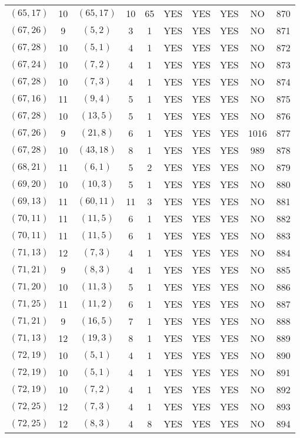\begin{longtable}{|c|c|c|c|c|c|c|c|c|c|}
$(65, 17)$ & 10 & $(65, 17)$ & 10 & 65 & YES & YES & YES & NO & 870\\
$(67, 26)$ & 9 & $(5, 2)$ & 3 & 1 & YES & YES & YES & NO & 871\\
$(67, 28)$ & 10 & $(5, 1)$ & 4 & 1 & YES & YES & YES & NO & 872\\
$(67, 24)$ & 10 & $(7, 2)$ & 4 & 1 & YES & YES & YES & NO & 873\\
$(67, 28)$ & 10 & $(7, 3)$ & 4 & 1 & YES & YES & YES & NO & 874\\
$(67, 16)$ & 11 & $(9, 4)$ & 5 & 1 & YES & YES & YES & NO & 875\\
$(67, 28)$ & 10 & $(13, 5)$ & 5 & 1 & YES & YES & YES & NO & 876\\
$(67, 26)$ & 9 & $(21, 8)$ & 6 & 1 & YES & YES & YES & 1016 & 877\\
$(67, 28)$ & 10 & $(43, 18)$ & 8 & 1 & YES & YES & YES & 989 & 878\\
$(68, 21)$ & 11 & $(6, 1)$ & 5 & 2 & YES & YES & YES & NO & 879\\
$(69, 20)$ & 10 & $(10, 3)$ & 5 & 1 & YES & YES & YES & NO & 880\\
$(69, 13)$ & 11 & $(60, 11)$ & 11 & 3 & YES & YES & YES & NO & 881\\
$(70, 11)$ & 11 & $(11, 5)$ & 6 & 1 & YES & YES & YES & NO & 882\\
$(70, 11)$ & 11 & $(11, 5)$ & 6 & 1 & YES & YES & YES & NO & 883\\
$(71, 13)$ & 12 & $(7, 3)$ & 4 & 1 & YES & YES & YES & NO & 884\\
$(71, 21)$ & 9 & $(8, 3)$ & 4 & 1 & YES & YES & YES & NO & 885\\
$(71, 20)$ & 10 & $(11, 3)$ & 5 & 1 & YES & YES & YES & NO & 886\\
$(71, 25)$ & 11 & $(11, 2)$ & 6 & 1 & YES & YES & YES & NO & 887\\
$(71, 21)$ & 9 & $(16, 5)$ & 7 & 1 & YES & YES & YES & NO & 888\\
$(71, 13)$ & 12 & $(19, 3)$ & 8 & 1 & YES & YES & YES & NO & 889\\
$(72, 19)$ & 10 & $(5, 1)$ & 4 & 1 & YES & YES & YES & NO & 890\\
$(72, 19)$ & 10 & $(5, 1)$ & 4 & 1 & YES & YES & YES & NO & 891\\
$(72, 19)$ & 10 & $(7, 2)$ & 4 & 1 & YES & YES & YES & NO & 892\\
$(72, 25)$ & 12 & $(7, 3)$ & 4 & 1 & YES & YES & YES & NO & 893\\
$(72, 25)$ & 12 & $(8, 3)$ & 4 & 8 & YES & YES & YES & NO & 894\\

\end{longtable}
